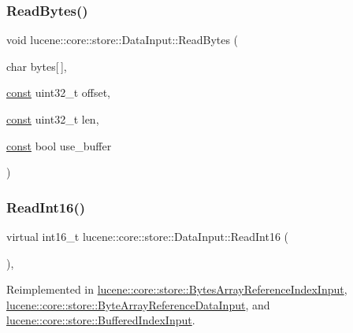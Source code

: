 \subsubsection{\texorpdfstring{Read\+Bytes()}{ReadBytes()}\hspace{0.1cm}{\footnotesize\ttfamily [2/2]}}
{\footnotesize\ttfamily void lucene\+::core\+::store\+::\+Data\+Input\+::\+Read\+Bytes (\begin{DoxyParamCaption}\item[{char}]{bytes\mbox{[}$\,$\mbox{]},  }\item[{\mbox{\hyperlink{ZlibCrc32_8h_a2c212835823e3c54a8ab6d95c652660e}{const}} uint32\+\_\+t}]{offset,  }\item[{\mbox{\hyperlink{ZlibCrc32_8h_a2c212835823e3c54a8ab6d95c652660e}{const}} uint32\+\_\+t}]{len,  }\item[{\mbox{\hyperlink{ZlibCrc32_8h_a2c212835823e3c54a8ab6d95c652660e}{const}} bool}]{use\+\_\+buffer }\end{DoxyParamCaption})\hspace{0.3cm}{\ttfamily [inline]}}

\mbox{\label{classlucene_1_1core_1_1store_1_1DataInput_aeb6d3697693dac6f16a2df5e3f50091d}} 
\subsubsection{\texorpdfstring{Read\+Int16()}{ReadInt16()}}
{\footnotesize\ttfamily virtual int16\+\_\+t lucene\+::core\+::store\+::\+Data\+Input\+::\+Read\+Int16 (\begin{DoxyParamCaption}{ }\end{DoxyParamCaption})\hspace{0.3cm}{\ttfamily [inline]}, {\ttfamily [virtual]}}



Reimplemented in \mbox{\hyperlink{classlucene_1_1core_1_1store_1_1BytesArrayReferenceIndexInput_ab8c3794f54c8695921ccabdf0111ebed}{lucene\+::core\+::store\+::\+Bytes\+Array\+Reference\+Index\+Input}}, \mbox{\hyperlink{classlucene_1_1core_1_1store_1_1ByteArrayReferenceDataInput_ad2364c5c8e9de32da1af2c0806776d8e}{lucene\+::core\+::store\+::\+Byte\+Array\+Reference\+Data\+Input}}, and \mbox{\hyperlink{classlucene_1_1core_1_1store_1_1BufferedIndexInput_ae3c6ec72361c91307e01899da55df4b2}{lucene\+::core\+::store\+::\+Buffered\+Index\+Input}}.

